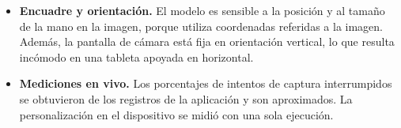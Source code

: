 \begin{itemize}
    \item \textbf{Encuadre y orientación.} El modelo es sensible a la posición y al tamaño de la mano en la imagen, porque utiliza coordenadas referidas a la imagen. Además, la pantalla de cámara está fija en orientación vertical, lo que resulta incómodo en una tableta apoyada en horizontal.
    \item \textbf{Mediciones en vivo.} Los porcentajes de intentos de captura interrumpidos se obtuvieron de los registros de la aplicación y son aproximados. La personalización en el dispositivo se midió con una sola ejecución.
\end{itemize}

